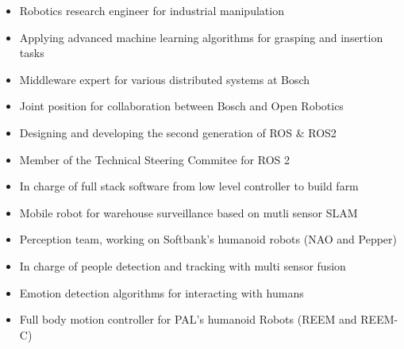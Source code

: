 \documentclass[11pt,a4paper,sans]{moderncv} %
\begin{document}
\begin{itemize}
\setlength{\itemindent}{1in}
\item Robotics research engineer for industrial manipulation
\item Applying advanced machine learning algorithms for grasping and insertion tasks
\item Middleware expert for various distributed systems at Bosch
\end{itemize}

\begin{itemize}
\setlength{\itemindent}{1in}
\item Joint position for collaboration between Bosch and Open Robotics
\item Designing and developing the second generation of ROS \& ROS2
\item Member of the Technical Steering Commitee for ROS 2
\end{itemize}

\begin{itemize}
\setlength{\itemindent}{1in}
\item In charge of full stack software from low level controller to build farm
\item Mobile robot for warehouse surveillance based on mutli sensor SLAM
\end{itemize}

\begin{itemize}
\setlength{\itemindent}{1in}
\item Perception team, working on Softbank’s humanoid robots (NAO and Pepper)
\item In charge of people detection and tracking with multi sensor fusion
\item Emotion detection algorithms for interacting with humans
\end{itemize}

\begin{itemize}
\setlength{\itemindent}{1in}
\item Full body motion controller for PAL’s humanoid Robots (REEM and REEM-C)
\end{itemize}
\end{document}
